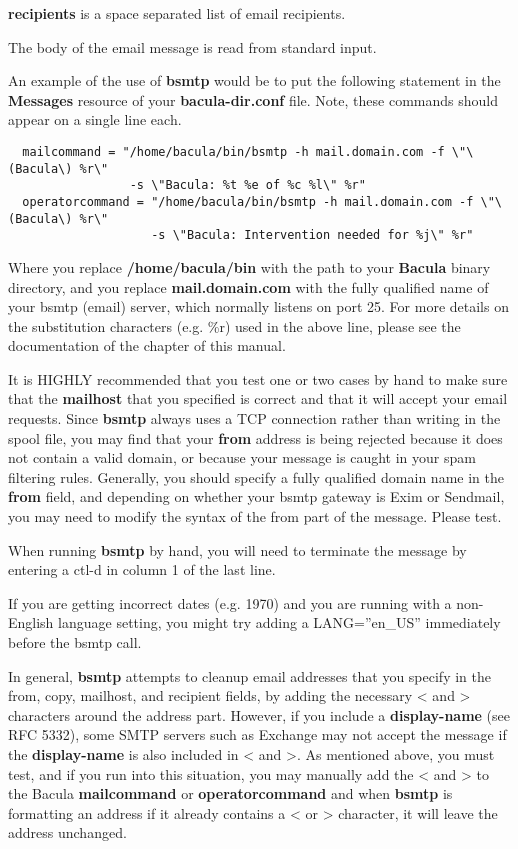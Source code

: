 {\bf recipients} is a space separated list of email recipients.

The body of the email message is read from standard input.

An example of the use of {\bf bsmtp} would be to put the following statement
in the {\bf Messages} resource of your {\bf bacula-dir.conf} file. Note, these
commands should appear on a single line each.

\footnotesize
\begin{verbatim}
  mailcommand = "/home/bacula/bin/bsmtp -h mail.domain.com -f \"\(Bacula\) %r\"
                 -s \"Bacula: %t %e of %c %l\" %r"
  operatorcommand = "/home/bacula/bin/bsmtp -h mail.domain.com -f \"\(Bacula\) %r\"
                    -s \"Bacula: Intervention needed for %j\" %r"
\end{verbatim}
\normalsize

Where you replace {\bf /home/bacula/bin} with the path to your {\bf Bacula}
binary directory, and you replace {\bf mail.domain.com} with the fully
qualified name of your bsmtp (email) server, which normally listens on port
25. For more details on the substitution characters (e.g. \%r) used in the
above line, please see the documentation of the
chapter of this manual.

It is HIGHLY recommended that you test one or two cases by hand to make sure
that the {\bf mailhost} that you specified is correct and that it will accept
your email requests. Since {\bf bsmtp} always uses a TCP connection rather
than writing in the spool file, you may find that your {\bf from} address is
being rejected because it does not contain a valid domain, or because your
message is caught in your spam filtering rules. Generally, you should specify
a fully qualified domain name in the {\bf from} field, and depending on
whether your bsmtp gateway is Exim or Sendmail, you may need to modify the
syntax of the from part of the message. Please test.

When running {\bf bsmtp} by hand, you will need to terminate the message by
entering a ctl-d in column 1 of the last line.

If you are getting incorrect dates (e.g. 1970) and you are
running with a non-English language setting, you might try adding
a LANG=''en\_US'' immediately before the bsmtp call.

In general, {\bf bsmtp} attempts to cleanup email addresses that you
specify in the from, copy, mailhost, and recipient fields, by adding
the necessary {\textless} and {\textgreater} characters around the address part.  However,
if you include a {\bf display-name} (see RFC 5332), some SMTP servers
such as Exchange may not accept the message if the {\bf display-name} is
also included in {\textless} and {\textgreater}.  As mentioned above, you must test, and
if you run into this situation, you may manually add the {\textless} and {\textgreater}
to the Bacula {\bf mailcommand} or {\bf operatorcommand} and when
{\bf bsmtp} is formatting an address if it already contains a {\textless} or
{\textgreater} character, it will leave the address unchanged.

